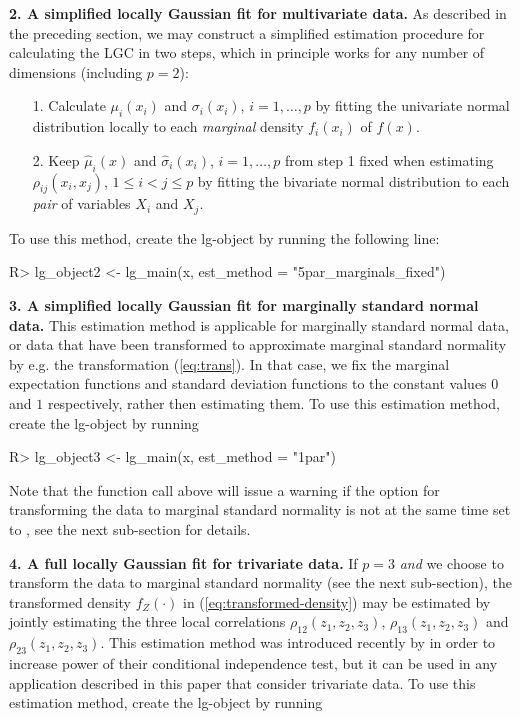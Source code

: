 \textbf{2. A simplified locally Gaussian fit for multivariate data.} As described in the preceding section, we may construct a simplified estimation procedure for calculating the LGC in two steps, which in principle works for any number of dimensions (including $p=2$):

\begin{itemize}
\item[1.] Calculate $\mu_i(x_i)$ and $\sigma_i(x_i)$, $i = 1,\ldots,p$ by fitting the univariate normal distribution locally to each \emph{marginal} density $f_i(x_i)$ of $f(x)$.
\item[2.] Keep $\widehat\mu_i(x)$ and $\widehat\sigma_i(x_i)$, $i=1,\ldots,p$ from step 1 fixed when estimating $\rho_{ij}(x_i, x_j)$, $1\leq i<j\leq p$ by fitting the bivariate normal distribution to each \emph{pair} of variables $X_i$ and $X_j$.
\end{itemize}
To use this method, create the lg-object by running the following line:

\begin{example}
R> lg_object2 <- lg_main(x, est_method = "5par_marginals_fixed")
\end{example}

\textbf{3. A simplified locally Gaussian fit for marginally standard normal data.} This estimation method is applicable for marginally standard normal data, or data that have been transformed to approximate marginal standard normality by e.g. the transformation (\ref{eq:trans}). In that case, we fix the marginal expectation functions and standard deviation functions to the constant values $0$ and $1$ respectively, rather then estimating them. To use this estimation method, create the lg-object by running

\begin{example}
R> lg_object3 <- lg_main(x, est_method = "1par")
\end{example}

Note that the function call above will issue a warning if the option for transforming the data to marginal standard normality is not at the same time set to , see the next sub-section for details.

\textbf{4. A full locally Gaussian fit for trivariate data.} If $p = 3$ \emph{and} we choose to transform the data to marginal standard normality (see the next sub-section), the transformed density $f_Z(\cdot)$ in (\ref{eq:transformed-density}) may be estimated by jointly estimating the three local correlations $\rho_{12}(z_1, z_2, z_3)$, $\rho_{13}(z_1, z_2, z_3)$ and $\rho_{23}(z_1, z_2, z_3)$. This estimation method was introduced recently by \citet{otne:tjos:2019} in order to increase power of their conditional independence test, but it can be used in any application described in this paper that consider trivariate data. To use this estimation method, create the lg-object by running

